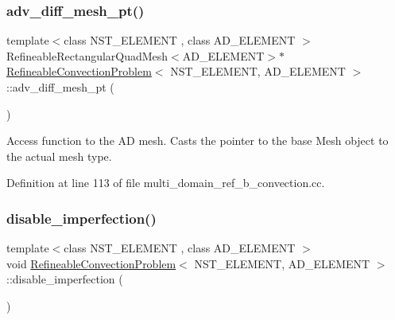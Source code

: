 \subsubsection{\texorpdfstring{adv\+\_\+diff\+\_\+mesh\+\_\+pt()}{adv\_diff\_mesh\_pt()}}
{\footnotesize\ttfamily template$<$class N\+S\+T\+\_\+\+E\+L\+E\+M\+E\+NT , class A\+D\+\_\+\+E\+L\+E\+M\+E\+NT $>$ \\
Refineable\+Rectangular\+Quad\+Mesh$<$A\+D\+\_\+\+E\+L\+E\+M\+E\+NT$>$$\ast$ \hyperlink{classRefineableConvectionProblem}{Refineable\+Convection\+Problem}$<$ N\+S\+T\+\_\+\+E\+L\+E\+M\+E\+NT, A\+D\+\_\+\+E\+L\+E\+M\+E\+NT $>$\+::adv\+\_\+diff\+\_\+mesh\+\_\+pt (\begin{DoxyParamCaption}{ }\end{DoxyParamCaption})\hspace{0.3cm}{\ttfamily [inline]}}



Access function to the AD mesh. Casts the pointer to the base Mesh object to the actual mesh type. 



Definition at line 113 of file multi\+\_\+domain\+\_\+ref\+\_\+b\+\_\+convection.\+cc.

\mbox{\label{classRefineableConvectionProblem_a816f49163ff3ceb71aec4236aac10d84}} 
\subsubsection{\texorpdfstring{disable\+\_\+imperfection()}{disable\_imperfection()}\hspace{0.1cm}{\footnotesize\ttfamily [1/2]}}
{\footnotesize\ttfamily template$<$class N\+S\+T\+\_\+\+E\+L\+E\+M\+E\+NT , class A\+D\+\_\+\+E\+L\+E\+M\+E\+NT $>$ \\
void \hyperlink{classRefineableConvectionProblem}{Refineable\+Convection\+Problem}$<$ N\+S\+T\+\_\+\+E\+L\+E\+M\+E\+NT, A\+D\+\_\+\+E\+L\+E\+M\+E\+NT $>$\+::disable\+\_\+imperfection (\begin{DoxyParamCaption}{ }\end{DoxyParamCaption})\hspace{0.3cm}{\ttfamily [inline]}}



